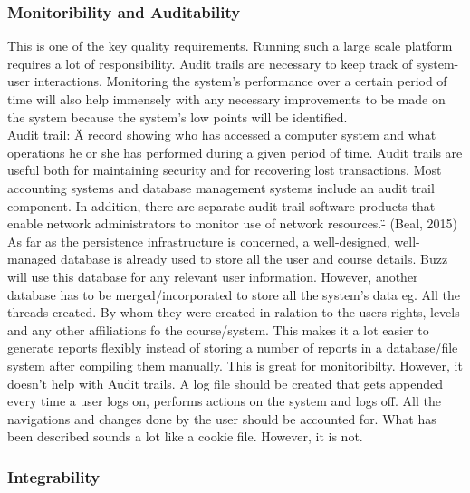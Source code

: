 \subsubsection{Monitoribility and Auditability}

This is one of the key  quality requirements. Running such a large scale platform requires a lot of responsibility. Audit trails are necessary to keep track of system-user interactions. Monitoring the system's performance over a certain period of time will also help immensely with any necessary improvements to be made on the system because the system's low points will be identified.\\
Audit trail: \"A record showing who has accessed a computer system and what operations he or she has performed during a given period of time. Audit trails are useful both for maintaining security and for recovering lost transactions. Most accounting systems and database management systems include an audit trail component. In addition, there are separate audit trail software products that enable network administrators to monitor use of network resources.\" - (Beal, 2015)\\

As far as the persistence infrastructure is concerned, a well-designed, well-managed database is already used to store all the user and course details. Buzz will use this database for any relevant user information. However,  another database has to be merged/incorporated to store all the system's data eg. All the threads created. By whom they were created in ralation to the users rights, levels and any other affiliations fo the course/system. This makes it a lot easier to generate reports flexibly instead of storing a number of reports in a database/file system after compiling them manually. This is great for monitoribilty. However, it doesn't help with Audit trails. A log file should be created that gets appended every time a user logs on, performs actions on the system and logs off. All the navigations and changes done by the user should be accounted for. What has been described sounds a lot like a cookie file. However, it is not.\\


\subsubsection{Integrability}

